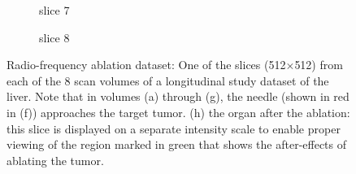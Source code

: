 \documentclass[journal]{IEEEtran}
\begin{document}
\begin{figure}[h!]
\begin{subfigure}[b]{0.23\linewidth}
 \caption{slice 7}
    \end{subfigure}
       \begin{subfigure}[b]{0.23\linewidth}
 \caption{slice 8}
    \end{subfigure}     
     \caption{Radio-frequency ablation dataset: One of the slices (512$\times$512) from each of the 8 scan volumes of a longitudinal study dataset of the liver. Note that in volumes (a) through (g), the needle (shown in red in (f)) approaches the target tumor. (h) the organ after the ablation: this slice is displayed on a separate intensity scale to enable proper viewing of the region marked in green that shows the after-effects of ablating the tumor.} 
\label{fig:RFA2_test_object-prior}
\end{figure}

\end{document}
